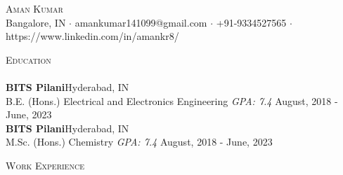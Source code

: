 \documentclass[a4paper]{article}
\newcommand{\lineunder} {
    \vspace*{-8pt} \\
    \hspace*{-18pt} \hrulefill \\
}
\newcommand{\header} [1] {
    {\hspace*{-18pt}\vspace*{6pt} \textsc{#1}}
    \vspace*{-6pt} \lineunder
}
\begin{document}
\vspace*{-40pt}

    

\vspace*{-10pt}
\begin{center}
	{\Huge \scshape {Aman Kumar}}\\
	Bangalore, IN $\cdot$ amankumar141099@gmail.com $\cdot$ +91-9334527565 $\cdot$ https://www.linkedin.com/in/amankr8/\\
\end{center}

\header{Education}
\textbf{BITS Pilani}\hfill Hyderabad, IN\\
B.E. (Hons.) Electrical and Electronics Engineering \textit{GPA: 7.4} \hfill August, 2018 - June, 2023\\
\vspace{2mm}
\textbf{BITS Pilani}\hfill Hyderabad, IN\\
M.Sc. (Hons.) Chemistry \textit{GPA: 7.4} \hfill August, 2018 - June, 2023\\
\vspace{2mm}

\header{Work Experience}
\vspace{1mm}
\end{document}

